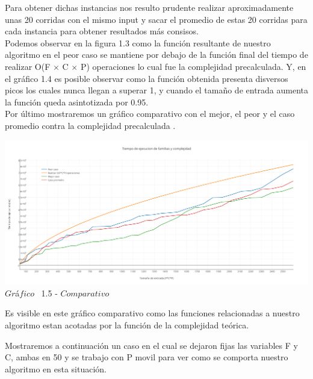  Para obtener dichas instancias nos resulto prudente realizar aproximadamente unas 20 corridas con el mismo input y sacar el promedio de estas 20 corridas para cada instancia para obtener resultados m\'as consisos.\\ 

Podemos observar en la figura 1.3 como la funci\'on resultante de nuestro algoritmo en el peor caso se mantiene por debajo de la funci\'on final del tiempo de realizar O(F $\times$ C $\times$ P) operaciones lo cual fue la complejidad precalculada. Y, en el gr\'afico 1.4 es posible observar como la funci\'on obtenida presenta disversos picos los cuales nunca llegan a superar 1, y cuando el tamaño de entrada aumenta la funci\'on queda asintotizada por 0.95.\\

Por \'ultimo mostraremos un gr\'afico comparativo con el mejor, el peor y el caso promedio contra la complejidad precalculada .\\

  
  \vspace*{0.3cm} \vspace*{0.3cm}
  \begin{center}
\includegraphics[scale=0.4]{./EJ1/comparativo1.png}
{$Gr$\'a$fico$ \ 1.5 - $Comparativo$}
  \end{center}
  \vspace*{0.3cm}
  
 Es visible en este gr\'afico comparativo como las funciones relacionadas a nuestro algoritmo estan acotadas por la funci\'on de la complejidad te\'orica.

Mostraremos a continuaci\'on un caso en el cual se dejaron fijas las variables F y C, ambas en 50 y se trabajo con P movil para ver como se comporta nuestro algoritmo en esta situaci\'on.

